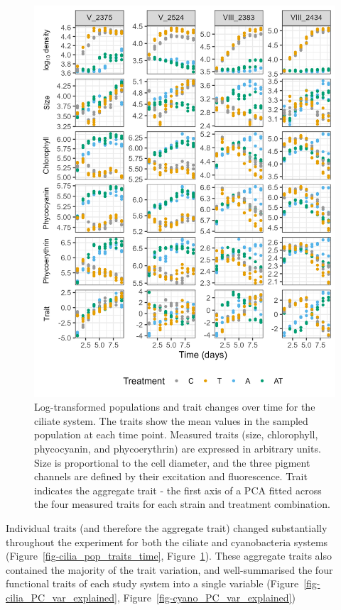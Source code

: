 \documentclass[
  letterpaper,
  DIV=11,
  numbers=noendperiod]{scrartcl}
\begin{document}
\begin{figure}

{\centering \includegraphics[width=5in,height=\textheight]{figures/cyano/cyano_pop-traits-time.png}

}

\caption{\label{fig-cyano_pop_traits_time}Log-transformed populations
and trait changes over time for the ciliate system. The traits show the
mean values in the sampled population at each time point. Measured
traits (size, chlorophyll, phycocyanin, and phycoerythrin) are expressed
in arbitrary units. Size is proportional to the cell diameter, and the
three pigment channels are defined by their excitation and fluorescence.
Trait indicates the aggregate trait - the first axis of a PCA fitted
across the four measured traits for each strain and treatment
combination.}

\end{figure}

Individual traits (and therefore the aggregate trait) changed
substantially throughout the experiment for both the ciliate and
cyanobacteria systems (Figure~\ref{fig-cilia_pop_traits_time},
Figure~\ref{fig-cyano_pop_traits_time}). These aggregate traits also
contained the majority of the trait variation, and well-summarised the
four functional traits of each study system into a single variable
(Figure~\ref{fig-cilia_PC_var_explained},
Figure~\ref{fig-cyano_PC_var_explained})
\end{document}
